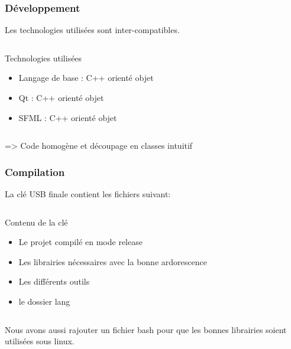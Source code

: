 \begin{frame}
	\frametitle{Développement}
	Les technologies utilisées sont inter-compatibles.
		
	\begin{columns}[t]
		\begin{column}{10cm}
			\begin{exampleblock}{Technologies utilisées}
				\begin{itemize}
					\item Langage de base : C++ orienté objet
					\item Qt : C++ orienté objet
					\item SFML : C++ orienté objet
				\end{itemize}
			\end{exampleblock} 
		\end{column}
	\end{columns}
	
	\bigskip
	
	=> Code homogène et découpage en classes intuitif
\end{frame}


\begin{frame}
	\frametitle{Compilation}
        La clé USB finale contient les fichiers suivant:
        
	\begin{columns}[t]
		\begin{column}{10cm}
			\begin{exampleblock}{Contenu de la clé}
				\begin{itemize}
					\item Le projet compilé en mode release
					\item Les librairies nécessaires avec la bonne ardorescence
					\item Les différents outils
                                        \item le dossier lang
				\end{itemize}
			\end{exampleblock} 
		\end{column}
	\end{columns}
	
	\bigskip
	
        Nous avons aussi rajouter un fichier bash pour que les bonnes librairies soient utilisées sous linux.
	
\end{frame}
